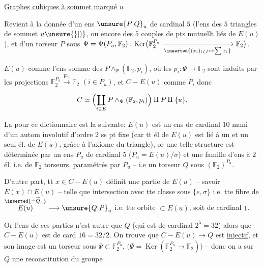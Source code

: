 
\uline{Graphes cubiques  à sommet marqué} $u$

Revient à la donnée d'un ens $\unsure{P|Q}_u$ de cardinal $5$ (l'ens des $5$ triangles de sommet $u\unsure{\}|)}$, ou encore des $5$ couples de pts mutuellt liés de $E(u)$), et d'un torseur $P$ sous $\Psi=\Psi(P_u,\mathbb F_2):\operatorname{Ker}\bigl(\mathbb F_2^{P_u}\xrightarrow[\inserted{(x_i)_{i\in I}\mapsto\sum x_i}]{}\mathbb F_2\bigr)$.  

$E(u)$ comme l'ens somme des $P\wedge_\Psi(\mathbb F_2,p_i)$, où les $p_i:\Psi\longrightarrow\mathbb F_2$  sont induits par les projections $\mathbb F_2^{P_u}\xrightarrow{\mathrm{pr}_i}\mathbb F_2$ $(i\in P_u)$, et $C-E(u)$ comme $P$, donc

\[
 C\simeq\Bigl(\coprod_{i\in E}P\wedge_\Psi(\mathbb F_2,p_i)\Bigr)\amalg P\amalg\{u\}.
\]

La  pour ce dictionnaire est la suivante: $E(u)$ est un ens de cardinal $10$ muni d'un autom involutif d'ordre $2$ ss pt fixe (car tt él de $E(u)$ est lié à un et un seul él. de $E(u)$, grâce à l'axiome du triangle), or une telle structure est déterminée par un ens $P_u$ de cardinal $5$ ($P_u=E(u)/\sigma$) et une famille d'ens à $2$ él. i.e. de $\mathbb F_2$ torseurs, paramétrés par $P_u$ -- i.e un torseur $Q$ sous $(\mathbb F_2)^{P_u}$.

D'autre part, tt $x\in C-E(u)$ définit une partie de $E(u)$ -- savoir $E(x)\cap E(u)$ -- telle que  intersection avec tte classe sous $\{e,\sigma\}$ i.e. tte fibre de $\overset{\inserted{=\widetilde Q_u}}{E(u)}\longrightarrow\unsure{Q|P}_u$ i.e. tte orbite $\subset E(u)$, soit de cardinal $1$.

Or l'ens de ces parties n'est autre que $Q$ (qui est de cardinal $2^5=32$) alors que $C-E(u)$ est de card $16=32/2$. On trouve que $C-E(u)\longrightarrow Q$ est \uline{injectif}, et son image  est un torseur sous $\Psi\subset\mathbb F_2^{P_u}$, $\bigl(\Psi=\operatorname{Ker}(\mathbb F_2^{P_u}\longrightarrow\mathbb F_2)\bigr)$ -- donc on a sur $Q$ une reconstitution du groupe

